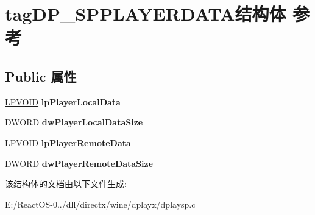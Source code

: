 \hypertarget{structtag_d_p___s_p_p_l_a_y_e_r_d_a_t_a}{}\section{tag\+D\+P\+\_\+\+S\+P\+P\+L\+A\+Y\+E\+R\+D\+A\+T\+A结构体 参考}
\label{structtag_d_p___s_p_p_l_a_y_e_r_d_a_t_a}
\subsection*{Public 属性}
\begin{DoxyCompactItemize}
\item 
\mbox{\label{structtag_d_p___s_p_p_l_a_y_e_r_d_a_t_a_a9fdaa05867c469171bfc064a8dcc1f1c}} 
\hyperlink{interfacevoid}{L\+P\+V\+O\+ID} {\bfseries lp\+Player\+Local\+Data}
\item 
\mbox{\label{structtag_d_p___s_p_p_l_a_y_e_r_d_a_t_a_a37dd7a1f32636b18ba71b20669e1b1fd}} 
D\+W\+O\+RD {\bfseries dw\+Player\+Local\+Data\+Size}
\item 
\mbox{\label{structtag_d_p___s_p_p_l_a_y_e_r_d_a_t_a_a3aaedb8dc86de9f652af6fbad1a83e2b}} 
\hyperlink{interfacevoid}{L\+P\+V\+O\+ID} {\bfseries lp\+Player\+Remote\+Data}
\item 
\mbox{\label{structtag_d_p___s_p_p_l_a_y_e_r_d_a_t_a_a059841e0ec37369743339e9e47b28b78}} 
D\+W\+O\+RD {\bfseries dw\+Player\+Remote\+Data\+Size}
\end{DoxyCompactItemize}


该结构体的文档由以下文件生成\+:\begin{DoxyCompactItemize}
\item 
E\+:/\+React\+O\+S-\/0../dll/directx/wine/dplayx/dplaysp.\+c\end{DoxyCompactItemize}
